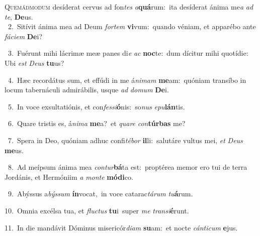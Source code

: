 \lettrine{\initial\textcolor{\initialcolor}{Q}}{uemádmodum} desíderat cervus ad fon\textit{tes} \textit{a}\-\textbf{quá}rum:~\star ita desíderat ánima me\textit{a} \textit{ad} \textit{te}\-, \textbf{De}\-us.\\
{\numbfont\textcolor{\numbcolor}{~2.}}~Sitívit ánima mea ad Deum \textit{for}\-\textit{tem} \textbf{vi}\-vum:~\star quando véniam, et apparébo ante \textit{fá}\-\textit{ci}\textit{em} \textbf{De}\-i?\par
{\numbfont\textcolor{\numbcolor}{~3.}}~Fuérunt mihi lácrimæ meæ panes di\textit{e} \textit{ac} \textbf{noc}\-te:~\star dum dícitur mihi quotídie: Ubi \textit{est} \textit{De}\-\textit{us} \textbf{tu}\-us?\par
{\numbfont\textcolor{\numbcolor}{~4.}}~Hæc recordátus sum, et effúdi in me á\-\textit{ni}\-\textit{mam} \textbf{me}\-am:~\star quóniam transíbo in locum tabernáculi admirábilis, usque \textit{ad} \textit{do}\-\textit{mum} \textbf{De}\-i.\par
{\numbfont\textcolor{\numbcolor}{~5.}}~In voce exsultatiónis, et con\-\textit{fes}\-\textit{si}\textbf{ó}nis:~\star so\textit{nus} \textit{e}\-\textit{pu}\textbf{lán}tis.\par
{\numbfont\textcolor{\numbcolor}{~6.}}~Quare tristis es, á\-\textit{ni}\-\textit{ma} \textbf{me}\-a?~\star et \textit{qua}\-\textit{re} \textit{con}\-\textbf{túr}\textbf{bas} me?\par
{\numbfont\textcolor{\numbcolor}{~7.}}~Spera in Deo, quóniam adhuc confi\-\textit{té}\-\textit{bor} \textbf{il}\-li:~\star salutáre vultus mei, \textit{et} \textit{De}\-\textit{us} \textbf{me}\-us.\par
{\numbfont\textcolor{\numbcolor}{~8.}}~Ad meípsum ánima mea \textit{con}\-\textit{tur}\textbf{bá}ta est:~\star proptérea memor ero tui de terra Jordánis, et Hermóniim \textit{a} \textit{mon}\-\textit{te} \textbf{mó}\-\textbf{di}co.\par
{\numbfont\textcolor{\numbcolor}{~9.}}~Abýssus a\-\textit{býs}\-\textit{sum} \textbf{ín}\-vocat,~\star in voce catarac\-\textit{tá}\-\textit{rum} \textit{tu}\-\textbf{á}rum.\par
{\numbfont\textcolor{\numbcolor}{10.}}~Omnia excélsa tua, et \textit{fluc}\-\textit{tus} \textbf{tu}\-i~\star super \textit{me} \textit{trans}\-\textit{i}\textbf{é}runt.\par
{\numbfont\textcolor{\numbcolor}{11.}}~In die mandávit Dóminus misericór\-\textit{di}\-\textit{am} \textbf{su}\-am:~\star et nocte \textit{cán}\-\textit{ti}\textit{cum} \textbf{e}\-jus.\par
